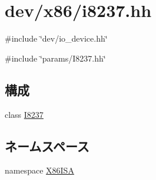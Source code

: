 \hypertarget{i8237_8hh}{
\section{dev/x86/i8237.hh}
\label{i8237_8hh}
}
{\ttfamily \#include \char`\"{}dev/io\_\-device.hh\char`\"{}}\par
{\ttfamily \#include \char`\"{}params/I8237.hh\char`\"{}}\par
\subsection*{構成}
\begin{DoxyCompactItemize}
\item 
class \hyperlink{classX86ISA_1_1I8237}{I8237}
\end{DoxyCompactItemize}
\subsection*{ネームスペース}
\begin{DoxyCompactItemize}
\item 
namespace \hyperlink{namespaceX86ISA}{X86ISA}
\end{DoxyCompactItemize}
